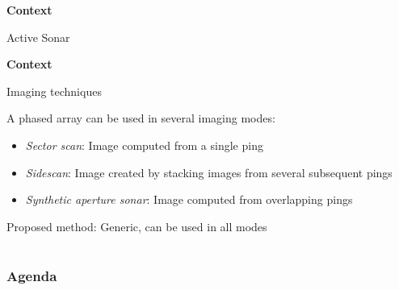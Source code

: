 \documentclass[
    beamer                                       %
 , xelatex                                      %
]{common/mytemplate}
\begin{document}
{
\renewcommand{\frametitle}[2]{{\vspace*{10pt}\bf\Large #1\par}}
\begin{frame}
\frametitle{Context}
\framesubtitle{Active Sonar}
\vspace{-25pt}
\begin{figure}[H]
\begin{narrow}{-0.5cm}{0pt}
\hspace{-10pt}
\end{narrow}
\end{figure}
\end{frame}

\begin{frame}
\frametitle{Context}
\framesubtitle{Imaging techniques}
\vspace{-10pt}
\begin{figure}[H]
\begin{narrow}{-0.5cm}{0pt}
\hspace{-10pt}
\end{narrow}
\end{figure}
A phased array can be used in several imaging modes:
\begin{itemize}
\item \emph{Sector scan}: Image computed from a single ping
\item \emph{Sidescan}: Image created by stacking images from several subsequent pings
\item \emph{Synthetic aperture sonar}: Image computed from overlapping pings
\end{itemize}
\begin{block}{Proposed method: Generic, can be used in all modes}
\vspace{-25pt}
\end{block}
\end{frame}
}

\section*{}
\begin{frame}
  \frametitle{Agenda}
  \tableofcontents%
\end{frame}
\end{document}

